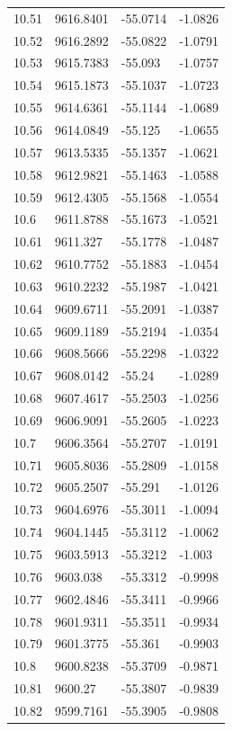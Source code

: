 \begin{table}[H]
\begin{tabular}{llll}
10.51 & 9616.8401 & -55.0714 & -1.0826 \\
10.52 & 9616.2892 & -55.0822 & -1.0791 \\
10.53 & 9615.7383 & -55.093 & -1.0757 \\
10.54 & 9615.1873 & -55.1037 & -1.0723 \\
10.55 & 9614.6361 & -55.1144 & -1.0689 \\
10.56 & 9614.0849 & -55.125 & -1.0655 \\
10.57 & 9613.5335 & -55.1357 & -1.0621 \\
10.58 & 9612.9821 & -55.1463 & -1.0588 \\
10.59 & 9612.4305 & -55.1568 & -1.0554 \\
10.6 & 9611.8788 & -55.1673 & -1.0521 \\
10.61 & 9611.327 & -55.1778 & -1.0487 \\
10.62 & 9610.7752 & -55.1883 & -1.0454 \\
10.63 & 9610.2232 & -55.1987 & -1.0421 \\
10.64 & 9609.6711 & -55.2091 & -1.0387 \\
10.65 & 9609.1189 & -55.2194 & -1.0354 \\
10.66 & 9608.5666 & -55.2298 & -1.0322 \\
10.67 & 9608.0142 & -55.24 & -1.0289 \\
10.68 & 9607.4617 & -55.2503 & -1.0256 \\
10.69 & 9606.9091 & -55.2605 & -1.0223 \\
10.7 & 9606.3564 & -55.2707 & -1.0191 \\
10.71 & 9605.8036 & -55.2809 & -1.0158 \\
10.72 & 9605.2507 & -55.291 & -1.0126 \\
10.73 & 9604.6976 & -55.3011 & -1.0094 \\
10.74 & 9604.1445 & -55.3112 & -1.0062 \\
10.75 & 9603.5913 & -55.3212 & -1.003 \\
10.76 & 9603.038 & -55.3312 & -0.9998 \\
10.77 & 9602.4846 & -55.3411 & -0.9966 \\
10.78 & 9601.9311 & -55.3511 & -0.9934 \\
10.79 & 9601.3775 & -55.361 & -0.9903 \\
10.8 & 9600.8238 & -55.3709 & -0.9871 \\
10.81 & 9600.27 & -55.3807 & -0.9839 \\
10.82 & 9599.7161 & -55.3905 & -0.9808 \\

\end{tabular}
\end{table}
